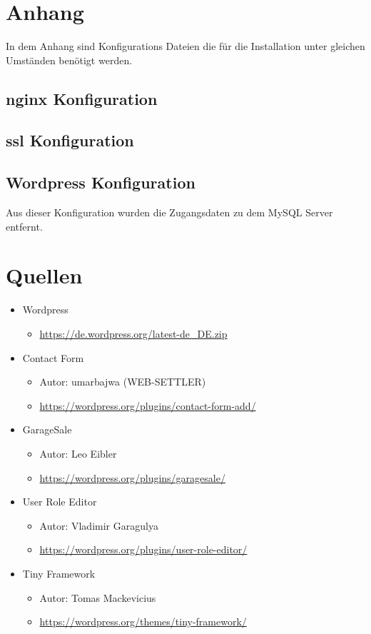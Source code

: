 \documentclass[a4paper, DIV20, 11pt, headsepline, parskip]{article}
\begin{document}
\section{Anhang}
In dem Anhang sind Konfigurations Dateien die für die Installation unter gleichen Umständen benötigt werden.
\subsection{nginx Konfiguration}

\subsection{ssl Konfiguration}

\subsection{Wordpress Konfiguration}
Aus dieser Konfiguration wurden die Zugangsdaten zu dem MySQL Server entfernt.

\pagebreak
\section{Quellen}
\begin{itemize}
\item Wordpress
\begin{itemize}
\item \url{https://de.wordpress.org/latest-de_DE.zip}
\end{itemize}
\item Contact Form
\begin{itemize}
\item Autor: umarbajwa (WEB-SETTLER)
\item \url{https://wordpress.org/plugins/contact-form-add/}
\end{itemize}
\item GarageSale
\begin{itemize}
\item Autor: Leo Eibler
\item \url{https://wordpress.org/plugins/garagesale/}
\end{itemize}
\item User Role Editor
\begin{itemize}
\item Autor: Vladimir Garagulya
\item \url{https://wordpress.org/plugins/user-role-editor/}
\end{itemize}
\item Tiny Framework
\begin{itemize}
\item Autor: Tomas Mackevicius
\item \url{https://wordpress.org/themes/tiny-framework/}
\end{itemize}
\end{itemize}

\end{document}
